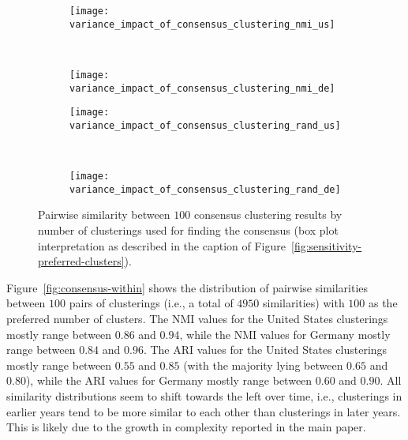 \begin{figure}[H]
	\centering
	\begin{subfigure}{0.5\linewidth}
		\texttt{[image: variance\_impact\_of\_consensus\_clustering\_nmi\_us]}
	\end{subfigure}~%
	\begin{subfigure}{0.5\linewidth}
		\texttt{[image: variance\_impact\_of\_consensus\_clustering\_nmi\_de]}
	\end{subfigure}
	\begin{subfigure}{0.5\linewidth}
		\texttt{[image: variance\_impact\_of\_consensus\_clustering\_rand\_us]}
	\end{subfigure}~%
	\begin{subfigure}{0.5\linewidth}
		\texttt{[image: variance\_impact\_of\_consensus\_clustering\_rand\_de]}
	\end{subfigure}
	\caption{Pairwise similarity between $100$ consensus clustering results by number of clusterings used for finding the consensus (box plot interpretation as described in the caption of  Figure~\ref{fig:sensitivity-preferred-clusters}).
	}
\label{fig:consensus-effect}
\end{figure}

Figure~\ref{fig:consensus-within} shows the distribution of pairwise similarities between $100$ pairs of clusterings (i.e., a total of $4950$ similarities) with $100$ as the preferred number of clusters. 
The NMI values for the United States clusterings mostly range between $0.86$ and $0.94$, while the NMI values for Germany mostly range between $0.84$ and $0.96$.
The ARI values for the United States clusterings mostly range between $0.55$ and $0.85$ (with the majority lying between $0.65$ and $0.80$), 
while the ARI values for Germany mostly range between $0.60$ and $0.90$.
All similarity distributions seem to shift towards the left over time, 
i.e., clusterings in earlier years tend to be more similar to each other than clusterings in later years. 
This is likely due to the growth in complexity reported in the main paper.

